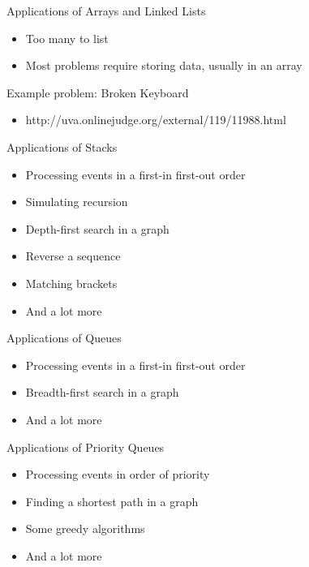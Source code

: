 \documentclass[12pt,t]{beamer}
\newcommand{\bi}{\begin{itemize}}
\newcommand{\ei}{\end{itemize}}
\begin{document}
\begin{frame}{Applications of Arrays and Linked Lists}
    \vspace{40pt}
    \bi
        \item Too many to list
        \item Most problems require storing data, usually in an array
    \ei
\end{frame}

\begin{frame}{Example problem: Broken Keyboard}
    \bi
        \item http://uva.onlinejudge.org/external/119/11988.html
    \ei
\end{frame}

\begin{frame}{Applications of Stacks}
    \bi
        \item Processing events in a first-in first-out order
        \item Simulating recursion
        \item Depth-first search in a graph
        \item Reverse a sequence
        \item Matching brackets
        \item And a lot more
    \ei
\end{frame}

\begin{frame}{Applications of Queues}
    \bi
        \item Processing events in a first-in first-out order
        \item Breadth-first search in a graph
        \item And a lot more
    \ei
\end{frame}

\begin{frame}{Applications of Priority Queues}
    \bi
        \item Processing events in order of priority
        \item Finding a shortest path in a graph
        \item Some greedy algorithms
        \item And a lot more
    \ei
\end{frame}
\end{document}
